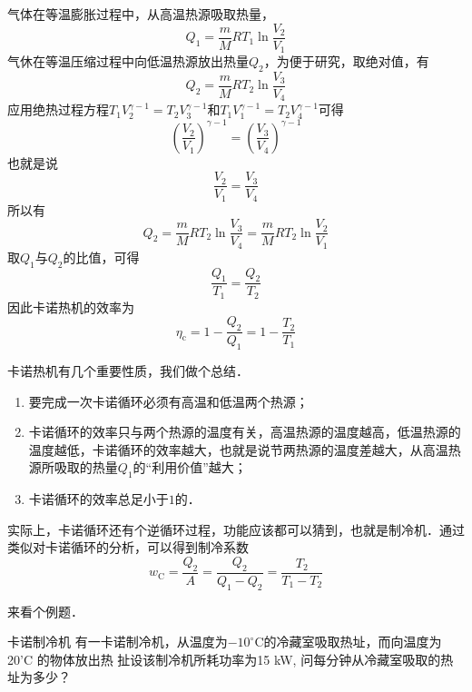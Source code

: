 气体在等温膨胀过程中，从高温热源吸取热量，
\begin{equation}
Q_{1}=\frac{m}{M} R T_{1} \ln \frac{V_{2}}{V_{1}}
\end{equation}
气休在等温压缩过程中向低温热源放出热量$Q_2$，为便于研究，取绝对值，有
\begin{equation}
Q_{2}=\frac{m}{M} R T_{2} \ln \frac{V_{3}}{V_{4}}
\end{equation}
应用绝热过程方程$T_{1} V_{2}^{\gamma-1}=T_{2} V_{3}^{\gamma-1}$和$T_{1} V_{1}^{\gamma-1}=T_{2} V_{4}^{\gamma-1}$可得
\begin{equation}
\left(\frac{V_{2}}{V_{1}}\right)^{\gamma-1}=\left(\frac{V_{3}}{V_{4}}\right)^{\gamma-1}
\end{equation}
也就是说
\begin{equation}
\frac{V_{2}}{V_{1}}=\frac{V_{3}}{V_{4}}
\end{equation}
所以有
\begin{equation}
Q_{2}=\frac{m}{M} R T_{2} \ln \frac{V_{3}}{V_{4}}=\frac{m}{M} R T_{2} \ln \frac{V_{2}}{V_{1}}
\end{equation}
取$Q_1$与$Q_2$的比值，可得
\begin{equation}
\frac{Q_{1}}{T_{1}}=\frac{Q_{2}}{T_{2}}
\end{equation}
因此卡诺热机的效率为
\begin{equation}
\eta_{\mathrm{c}}=1-\frac{Q_{2}}{Q_{1}}=1-\frac{T_{2}}{T_{1}}
\end{equation}

卡诺热机有几个重要性质，我们做个总结．

\begin{enumerate}
\item 要完成一次卡诺循环必须有高温和低温两个热源；
\item 卡诺循环的效率只与两个热源的温度有关，高温热源的温度越高，低温热源的温度越低，卡诺循环的效率越大，也就是说节两热源的温度差越大，从高温热源所吸取的热量$Q_1$的“利用价值”越大；
\item 卡诺循环的效率总足小于$1 $的．
\end{enumerate}

实际上，卡诺循环还有个逆循环过程，功能应该都可以猜到，也就是制冷机．通过类似对卡诺循环的分析，可以得到制冷系数
\begin{equation}
w_{\mathrm{C}}=\frac{Q_{2}}{A}=\frac{Q_{2}}{Q_{1}-Q_{2}}=\frac{T_{2}}{T_{1}-T_{2}}
\end{equation}

来看个例题．
\begin{example}{卡诺制冷机}
有一卡诺制冷机，从温度为$-10^{\circ} \mathrm{C}$的冷藏室吸取热址，而向温度为20'C 的物体放出热
扯设该制冷机所耗功率为15 kW, 问每分钟从冷藏室吸取的热址为多少？
\end{example}